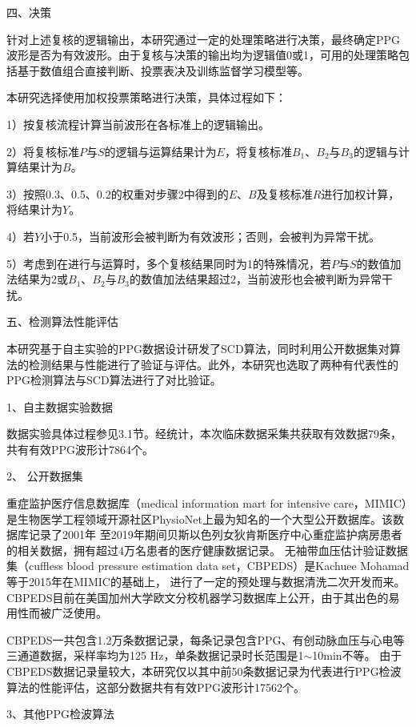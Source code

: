 四、决策

针对上述复核的逻辑输出，本研究通过一定的处理策略进行决策，最终确定PPG波形是否为有效波形。由于复核与决策的输出均为逻辑值0或1，可用的处理策略包括基于数值组合直接判断、投票表决及训练监督学习模型等\cite{Zhou2016}。

本研究选择使用加权投票策略进行决策，具体过程如下：

1）按复核流程计算当前波形在各标准上的逻辑输出。

2）将复核标准$P$与$S$的逻辑与运算结果计为$E$，将复核标准$B_1$、$B_2$与$B_3$的逻辑与计算结果计为$B$。

3）按照0.3、0.5、0.2的权重对步骤2中得到的$E$、$B$及复核标准$R$进行加权计算，将结果计为$Y$。

4）若$Y$小于0.5，当前波形会被判断为有效波形；否则，会被判为异常干扰。

5）考虑到在进行与运算时，多个复核结果同时为1的特殊情况，若$P$与$S$的数值加法结果为2或$B_1$、$B_2$与$B_3$的数值加法结果超过2，当前波形也会被判断为异常干扰。

五、检测算法性能评估

本研究基于自主实验的PPG数据设计研发了SCD算法，同时利用公开数据集对算法的检测结果与性能进行了验证与评估。此外，本研究也选取了两种有代表性的PPG检测算法与SCD算法进行了对比验证。

1、自主数据实验数据

数据实验具体过程参见3.1节。经统计，本次临床数据采集共获取有效数据79条，共有有效PPG波形计7864个。

2、 公开数据集

重症监护医疗信息数据库（medical information mart for intensive care，MIMIC）是生物医学工程领域开源社区PhysioNet上最为知名的一个大型公开数据库\cite{mit2022,Goldberger2000,johnson2018mimic,mimic4}。该数据库记录了2001年
至2019年期间贝斯以色列女狄肯斯医疗中心重症监护病房患者的相关数据，拥有超过4万名患者的医疗健康数据记录\cite{johnson2018mimic}。
无袖带血压估计验证数据集（cuffless blood pressure estimation data set，CBPEDS）是Kachuee Mohamad等\cite{Kachuee2015,ucibp2022}于2015年在MIMIC的基础上，
进行了一定的预处理与数据清洗二次开发而来。CBPEDS目前在美国加州大学欧文分校机器学习数据库上公开，由于其出色的易用性而被广泛使用。

CBPEDS一共包含1.2万条数据记录，每条记录包含PPG、有创动脉血压与心电等三通道数据，采样率均为125 Hz，单条数据记录时长范围是1$\sim$10min不等。
由于CBPEDS数据记录量较大，本研究仅以其中前50条数据记录为代表进行PPG检波算法的性能评估，这部分数据共有有效PPG波形计17562个。

3、其他PPG检波算法

